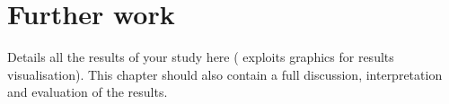 
\chapter{Further work}
\label{chap:furtherwork}
\ifpdf
    \graphicspath{{Algorithms/Figures/PNG/}{EvaluationTask/Figures/PDF/}{Algorithms/Figures/}}
\else
    \graphicspath{{Algorithms/Figures/EPS/}{EvaluationTask/Figures/}}
\fi


Details all the results of your study here ( exploits graphics for results visualisation). 
This chapter should also contain a full discussion, interpretation and evaluation of the results. 




